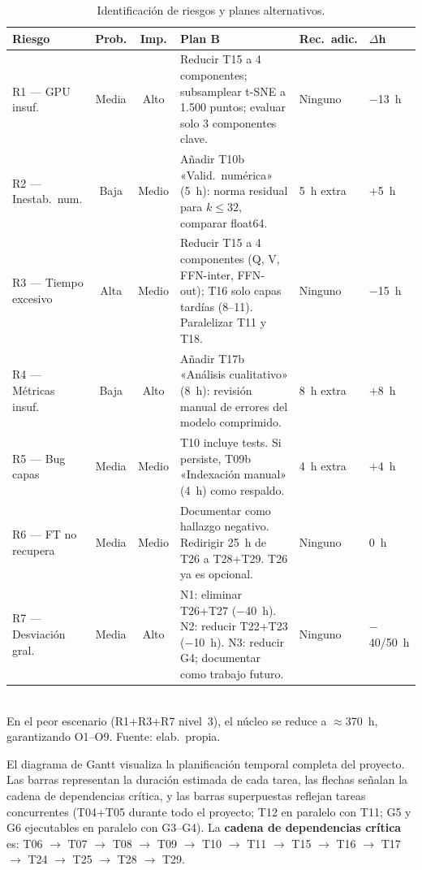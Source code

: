 \documentclass[11pt, a4paper]{article}
\begin{document}
\begin{table}[H]
\centering
\caption{Identificación de riesgos y planes alternativos.}
\label{tab:planesb}
\footnotesize
\begin{tabular}{@{}p{2.1cm} c c p{5.3cm} p{1.5cm} p{1.2cm}@{}}
\toprule
\textbf{Riesgo} & \textbf{Prob.} & \textbf{Imp.} & \textbf{Plan B} & \textbf{Rec.\ adic.} & \textbf{$\Delta$h} \\
\midrule
R1 --- GPU insuf.
  & Media & Alto
  & Reducir T15 a 4 componentes; subsamplear t-SNE a 1.500 puntos; evaluar solo 3 componentes clave.
  & Ninguno & $-$13~h \\
\midrule
R2 --- Inestab.\ num.
  & Baja & Medio
  & Añadir T10b «Valid.\ numérica» (5~h): norma residual para $k\leq32$, comparar float64.
  & 5~h extra & $+$5~h \\
\midrule
R3 --- Tiempo excesivo
  & Alta & Medio
  & Reducir T15 a 4 componentes (Q, V, FFN-inter, FFN-out); T16 solo capas tardías (8--11). Paralelizar T11 y T18.
  & Ninguno & $-$15~h \\
\midrule
R4 --- Métricas insuf.
  & Baja & Alto
  & Añadir T17b «Análisis cualitativo» (8~h): revisión manual de errores del modelo comprimido.
  & 8~h extra & $+$8~h \\
\midrule
R5 --- Bug capas
  & Media & Medio
  & T10 incluye tests. Si persiste, T09b «Indexación manual» (4~h) como respaldo.
  & 4~h extra & $+$4~h \\
\midrule
R6 --- FT no recupera
  & Media & Medio
  & Documentar como hallazgo negativo. Redirigir 25~h de T26 a T28+T29. T26 ya es opcional.
  & Ninguno & $0$~h \\
\midrule
R7 --- Desviación gral.
  & Media & Alto
  & N1: eliminar T26+T27 ($-$40~h). N2: reducir T22+T23 ($-$10~h). N3: reducir G4; documentar como trabajo futuro.
  & Ninguno & $-$40/50~h \\
\bottomrule
\end{tabular}
\\[0.15cm]{\small En el peor escenario (R1+R3+R7 nivel~3), el núcleo se reduce a $\approx$370~h, garantizando O1--O9. Fuente: elab.\ propia.}
\end{table}

El diagrama de Gantt visualiza la planificación temporal completa del proyecto. Las barras representan la duración estimada de cada tarea, las flechas señalan la cadena de dependencias crítica, y las barras superpuestas reflejan tareas concurrentes (T04+T05 durante todo el proyecto; T12 en paralelo con T11; G5 y G6 ejecutables en paralelo con G3--G4). La \textbf{cadena de dependencias crítica} es: T06 $\to$ T07 $\to$ T08 $\to$ T09 $\to$ T10 $\to$ T11 $\to$ T15 $\to$ T16 $\to$ T17 $\to$ T24 $\to$ T25 $\to$ T28 $\to$ T29.
\end{document}
